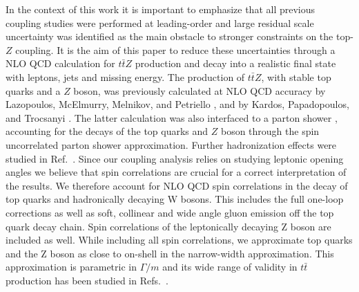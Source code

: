 \documentclass[preprint]{JHEP3} %
\def\Dphill{\Delta \phi_{ll}}
\def\ttbZ{t\bar{t}Z}
\def\ttb{t\bar{t}}
\def\ptZ{p_{t,Z}}
\begin{document}
In the context of this work it is important to emphasize that all previous coupling studies were performed at leading-order and large residual scale uncertainty 
was identified \cite{Baur:2004uw} as the main obstacle to stronger constraints on the top-$Z$ coupling.
It is the aim of this paper to reduce these uncertainties through a NLO QCD calculation for $\ttbZ$ production and decay into a realistic final state with leptons, jets and missing energy.
The production of $\ttbZ$, with stable top quarks and a $Z$ boson, was previously calculated at NLO QCD accuracy by 
Lazopoulos, McElmurry, Melnikov, and Petriello \cite{Lazopoulos:2008de}, and  by Kardos, Papadopoulos, and Trocsanyi \cite{Kardos:2011na}.
The latter calculation was also interfaced to a parton shower \cite{Garzelli:2011is}, accounting for the decays of the top quarks and $Z$ boson through 
the spin uncorrelated parton shower approximation.
Further hadronization effects were studied in Ref.~\cite{Garzelli:2012bn}.
Since our coupling analysis relies on studying leptonic opening angles we believe that spin correlations are crucial for a correct interpretation of the results.
We therefore account for NLO QCD spin correlations in the decay of top quarks and hadronically decaying W bosons.
This includes the full one-loop corrections as well as soft, collinear and wide angle gluon emission off the top quark decay chain.
Spin correlations of the leptonically decaying Z boson are included as well.
While including all spin correlations, we approximate top quarks and the Z boson as close to on-shell in the narrow-width approximation.
This approximation is parametric in $\Gamma/m$ and its wide range of validity in $\ttb$ production has been studied in Refs.~\cite{}.
\end{document}
